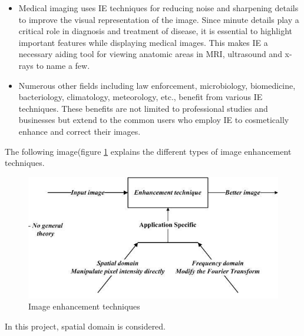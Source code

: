 \begin{itemize}
	\item Medical imaging uses IE techniques for reducing noise and sharpening details to improve the visual representation of the image. Since minute details play a critical role in diagnosis and treatment of disease, it is essential to highlight important features while displaying medical images. This makes IE a necessary aiding tool for viewing anatomic areas in MRI, ultrasound and x-rays to name a few.
	\item Numerous other fields including law enforcement, microbiology, biomedicine, bacteriology, climatology, meteorology, etc., benefit from various IE techniques. These benefits are not limited to professional studies and businesses but extend to the common users who employ IE to cosmetically enhance and correct their images.
	
\end{itemize}

The following image(figure \ref{fig:imageEnhancementTechniques} explains the different types of image enhancement techniques.

\begin{figure}
	\centering
	\includegraphics[scale=0.7]{images/ch2/imageEnhancementTechniques.jpg}
	\caption{Image enhancement techniques}
	\label{fig:imageEnhancementTechniques}
\end{figure}

In this project, spatial domain is considered.








